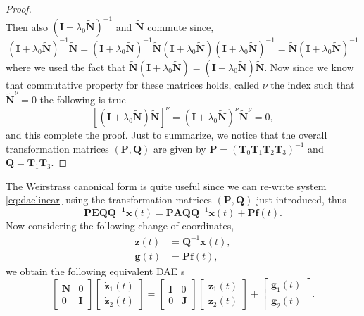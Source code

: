 \begin{proof}
\begin{equation}
			\end{equation} 
			Then also $(\bm{I}+\lambda_{0}\tilde{\bm{N}})^{-1}$ and $\tilde{\bm{N}}$ commute since, 
			\begin{equation}
				(\bm{I}+\lambda_{0}\tilde{\bm{N}})^{-1}\tilde{\bm{N}} = (\bm{I}+\lambda_{0}\tilde{\bm{N}})^{-1}\tilde{\bm{N}}(\bm{I}+\lambda_{0}\tilde{\bm{N}})(\bm{I}+\lambda_{0}\tilde{\bm{N}})^{-1} = \tilde{\bm{N}}(\bm{I}+\lambda_{0}\tilde{\bm{N}})^{-1}
			\end{equation}
			where we used the fact that $\tilde{\bm{N}}(\bm{I}+\lambda_{0}\tilde{\bm{N}})=(\bm{I}+\lambda_{0}\tilde{\bm{N}})\tilde{\bm{N}}$. Now since we know that commutative property for these matrices holds, called $\nu$ the index such that $\tilde{\bm{N}}^{\nu}=0$ the following is true
			\begin{equation}
				\left[(\bm{I}+\lambda_{0}\tilde{\bm{N}})\tilde{\bm{N}}\right]^{\nu} = (\bm{I}+\lambda_{0}\tilde{\bm{N}})^{\nu}\tilde{\bm{N}}^{\nu}=0,
			\end{equation} and this complete the proof. Just to summarize, we notice that the overall transformation matrices $(\bm{P},\bm{Q})$ are given by $\bm{P} = (\bm{T}_{0}\bm{T}_{1}\bm{T}_{2}\bm{T}_{3})^{-1}$ and $\bm{Q} = \bm{T}_{1}\bm{T}_{3}$.
		\end{proof}
		The Weirstrass canonical form is quite useful since we can re-write system \cref{eq:daelinear} using the transformation matrices $(\bm{P},\bm{Q})$ just introduced, thus
		\begin{equation}
				\bm{PEQQ^{-1}}\dot{\bm{x}}(t) = \bm{PAQQ}^{-1}\bm{x}(t)+\bm{Pf}(t).
		\end{equation}
		Now considering the following change of coordinates,
		\begin{subequations}
			\begin{align}
				\label{eq:changeofcoordinates}
				\bm{z}(t) &= \bm{Q}^{-1}\bm{x}(t), \\
				\bm{g}(t) &= \bm{Pf}(t),
			\end{align}
		\end{subequations}
		we obtain the following equivalent DAE s
		\begin{equation}
			\begin{bmatrix}
				\bm{N} & 0 \\
				0 & \bm{I}
			\end{bmatrix}
			\begin{bmatrix}
				\dot{\bm{z}}_{1}(t) \\
				\dot{\bm{z}}_{2}(t)
			\end{bmatrix} 
			= 
			\begin{bmatrix}
				\bm{I} & 0 \\
				0 & \bm{J}
			\end{bmatrix}
			\begin{bmatrix}
				\bm{z}_{1}(t) \\
				\bm{z}_{2}(t)
			\end{bmatrix}
			+ 
			\begin{bmatrix}
				\bm{g}_{1}(t) \\
				\bm{g}_{2}(t)
			\end{bmatrix}.
		\end{equation}

